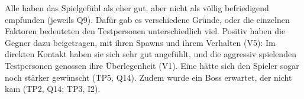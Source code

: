 \documentclass[../Main.tex]{subfiles}
\begin{document}
Alle haben das Spielgefühl als eher gut, aber nicht als völlig befriedigend empfunden (jeweils Q9). Dafür gab es verschiedene Gründe, oder die einzelnen Faktoren bedeuteten den Testpersonen unterschiedlich viel. Positiv haben die Gegner dazu beigetragen, mit ihren Spawns und ihrem Verhalten (V5): Im direkten Kontakt haben sie sich sehr gut angefühlt, und die aggressiv spielenden Testpersonen genossen ihre Überlegenheit (V1). Eine hätte sich den Spieler sogar noch stärker gewünscht (TP5, Q14). Zudem wurde ein Boss erwartet, der nicht kam (TP2, Q14; TP3, I2).
\end{document}
